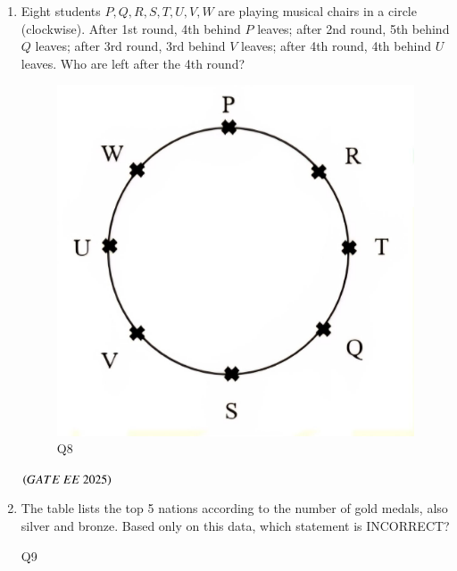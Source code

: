 \documentclass[journal,12pt,onecolumn]{IEEEtran}
\theoremstyle{remark}
\begin{document}
\begin{enumerate}
\item Eight students $P,Q,R,S,T,U,V,W$ are playing musical chairs in a circle (clockwise). After 1st round, 4th behind $P$ leaves; after 2nd round, 5th behind $Q$ leaves; after 3rd round, 3rd behind $V$ leaves; after 4th round, 4th behind $U$ leaves. Who are left after the 4th round? 
\begin{figure}[H]
\centering
\caption{Q8}
\label{Q8}
\includegraphics[scale=0.15]{figs/Q8.jpg}
\end{figure}
\hfill $\left(GATE\ EE\ 2025\right)$
\begin{enumerate}
\end{enumerate}

\item The table lists the top 5 nations according to the number of gold medals, also silver and bronze. Based only on this data, which statement is INCORRECT? 
\begin{table}[H]
\centering

\caption{Q9}
\label{Q9}
\end{table}


\end{enumerate}
\end{document}
